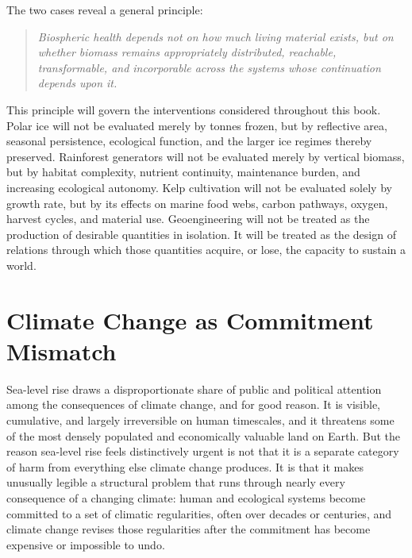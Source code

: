 \documentclass[11pt,oneside]{book}
\newenvironment{principle}
  {\begin{quote}\itshape}
  {\end{quote}}
\begin{document}
The two cases reveal a general principle:

\begin{principle}
Biospheric health depends not on how much living material exists, but on whether biomass remains appropriately distributed, reachable, transformable, and incorporable across the systems whose continuation depends upon it.
\end{principle}

This principle will govern the interventions considered throughout this book. Polar ice will not be evaluated merely by tonnes frozen, but by reflective area, seasonal persistence, ecological function, and the larger ice regimes thereby preserved. Rainforest generators will not be evaluated merely by vertical biomass, but by habitat complexity, nutrient continuity, maintenance burden, and increasing ecological autonomy. Kelp cultivation will not be evaluated solely by growth rate, but by its effects on marine food webs, carbon pathways, oxygen, harvest cycles, and material use. Geoengineering will not be treated as the production of desirable quantities in isolation. It will be treated as the design of relations through which those quantities acquire, or lose, the capacity to sustain a world.

\chapter{Climate Change as Commitment Mismatch}

Sea-level rise draws a disproportionate share of public and political attention among the consequences of climate change, and for good reason. It is visible, cumulative, and largely irreversible on human timescales, and it threatens some of the most densely populated and economically valuable land on Earth. But the reason sea-level rise feels distinctively urgent is not that it is a separate category of harm from everything else climate change produces. It is that it makes unusually legible a structural problem that runs through nearly every consequence of a changing climate: human and ecological systems become committed to a set of climatic regularities, often over decades or centuries, and climate change revises those regularities after the commitment has become expensive or impossible to undo.
\end{document}
